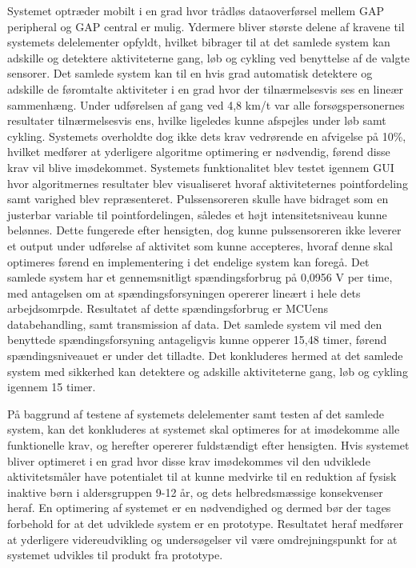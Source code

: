 Systemet optræder  mobilt i en grad hvor trådløs dataoverførsel mellem GAP peripheral og GAP central er mulig. Ydermere bliver største delene af kravene til systemets delelementer opfyldt, hvilket bibrager til at det samlede system kan adskille og detektere aktiviteterne gang, løb og cykling ved benyttelse af de valgte sensorer. Det samlede system kan til en hvis grad automatisk detektere og adskille de føromtalte aktiviteter i en grad hvor der tilnærmelsesvis ses en lineær sammenhæng. Under udførelsen af gang ved 4,8 km/t var alle forsøgspersonernes resultater tilnærmelsesvis ens, hvilke ligeledes kunne afspejles under løb samt cykling. Systemets overholdte dog ikke dets krav vedrørende en afvigelse på 10\%, hvilket medfører at yderligere algoritme optimering er nødvendig, førend disse krav vil blive imødekommet. Systemets funktionalitet blev testet igennem GUI hvor algoritmernes resultater blev visualiseret hvoraf aktiviteternes pointfordeling samt varighed blev repræsenteret. Pulssensoreren skulle have bidraget som en justerbar variable til pointfordelingen, således et højt intensitetsniveau kunne belønnes. Dette fungerede efter hensigten, dog kunne pulssensoreren ikke leverer et output under udførelse af aktivitet som kunne accepteres, hvoraf denne skal optimeres førend en implementering i det endelige system kan foregå. Det samlede system har et gennemsnitligt spændingsforbrug på 0,0956 V per time, med antagelsen om at spændingsforsyningen opererer lineært i hele dets arbejdsomrpde. Resultatet af dette spændingsforbrug er MCUens databehandling, samt transmission af data. Det samlede system vil med den benyttede spændingsforsyning antageligvis kunne opperer 15,48 timer, førend spændingsniveauet er under det tilladte. Det konkluderes hermed at det samlede system med sikkerhed kan detektere og adskille aktiviteterne gang, løb og cykling igennem 15 timer. 

På baggrund af testene af systemets delelementer samt testen af det samlede system, kan det konkluderes at systemet skal optimeres for at imødekomme alle funktionelle krav, og herefter opererer fuldstændigt efter hensigten. Hvis systemet bliver optimeret i en grad hvor disse krav imødekommes vil den udviklede aktivitetsmåler have potentialet til at kunne medvirke til en reduktion af fysisk inaktive børn i aldersgruppen 9-12 år, og dets helbredsmæssige konsekvenser heraf. En optimering af systemet er en nødvendighed og dermed bør der tages forbehold for at det udviklede system er en prototype. Resultatet heraf medfører at yderligere videreudvikling og undersøgelser vil være omdrejningspunkt for at systemet udvikles til produkt fra prototype.
